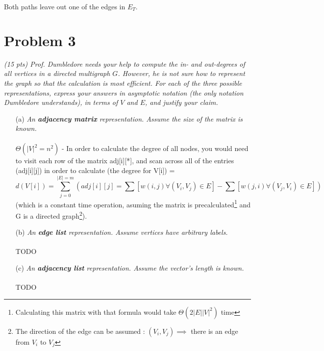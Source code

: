 \documentclass[12pt]{article} \setlength{\oddsidemargin}{0in}
\begin{document}
  Both paths leave out one of the edges in $E_T$. 

\newpage

\section*{Problem 3}

\textit{(15 pts) Prof. Dumbledore needs your help to compute the in-
  and out-degrees of all vertices in a directed multigraph
  $G$. However, he is not sure how to represent the graph so that the
  calculation is most efficient. For each of the three possible
  representations, express your answers in asymptotic notation (the
  only notation Dumbledore understands), in terms of $V$ and $E$, and
  justify your claim.}

\begin{enumerate}
\item[(a)]{\textit{An \textbf{adjacency matrix} representation. Assume
      the size of the matrix is known.}}\\\\
  $\Theta(|V|^2 = n^2)$ - In order to calculate the degree of all nodes, you would need to visit each row of the matrix adj[i][*], and scan across all of the entries (adj[i][j]) in order to calculate (the degree for V[i]) = $$d(V[i]) = \sum_{j=0}^{|E|=m}{(adj[i][j] = \sum{[w(i,j) \forall (V_i,V_j) \in E]} - \sum{[w(j,i) \forall (V_j,V_i) \in E]})}$$  (which is a constant time operation, asuming the matrix is precalculated\footnote{Calculating this matrix with that formula would take $\Theta(2|E||V|^2)$ time} and G is a directed graph\footnote{The direction of the edge can be assumed : $(V_i,V_j) \implies $ there is an edge from $V_i$ to $V_j$}). 
  \\
\item[(b)]{\textit{An \textbf{edge list} representation. Assume
      vertices have arbitrary labels.}}
  \\\\
  TODO
  \\
\item[(c)]{\textit{An \textbf{adjacency list} representation. Assume
      the vector’s length is known.}}
  \\\\
  TODO

\end{enumerate}

\newpage
\end{document}
